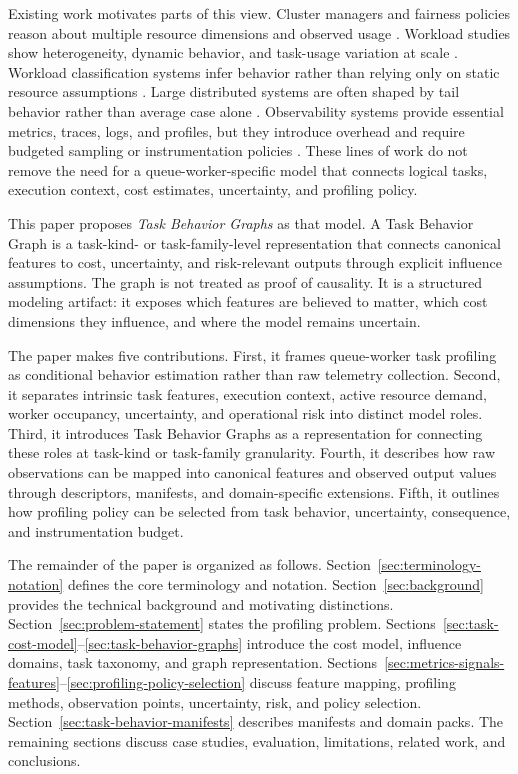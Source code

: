 Existing work motivates parts of this view. Cluster managers and fairness
policies reason about multiple resource dimensions and observed usage
\cite{verma2015borg,ghodsi2011drf}. Workload studies show heterogeneity,
dynamic behavior, and task-usage variation at scale
\cite{zhang2011taskusage,reiss2012heterogeneity,cheng2018alibaba}. Workload
classification systems infer behavior rather than relying only on static
resource assumptions \cite{delimitrou2013paragon,delimitrou2014quasar}. Large
distributed systems are often shaped by tail behavior rather than average case
alone \cite{dean2013tail}. Observability systems provide essential metrics,
traces, logs, and profiles, but they introduce overhead and require budgeted
sampling or instrumentation policies
\cite{sigelman2010dapper,opentelemetrySampling,opentelemetryPerformance}. These
lines of work do not remove the need for a queue-worker-specific model that
connects logical tasks, execution context, cost estimates, uncertainty, and
profiling policy.

This paper proposes \emph{Task Behavior Graphs} as that model. A Task Behavior
Graph is a task-kind- or task-family-level representation that connects
canonical features to cost, uncertainty, and risk-relevant outputs through
explicit influence assumptions. The graph is not treated as proof of causality.
It is a structured modeling artifact: it exposes which features are believed to
matter, which cost dimensions they influence, and where the model remains
uncertain.

The paper makes five contributions. First, it frames queue-worker task profiling
as conditional behavior estimation rather than raw telemetry collection. Second,
it separates intrinsic task features, execution context, active resource demand,
worker occupancy, uncertainty, and operational risk into distinct model roles.
Third, it introduces Task Behavior Graphs as a representation for connecting
these roles at task-kind or task-family granularity. Fourth, it describes how
raw observations can be mapped into canonical features and observed output
values through descriptors, manifests, and domain-specific extensions. Fifth, it
outlines how profiling policy can be selected from task behavior, uncertainty,
consequence, and instrumentation budget.

The remainder of the paper is organized as follows.
Section~\ref{sec:terminology-notation} defines the core terminology and
notation. Section~\ref{sec:background} provides the technical background and
motivating distinctions. Section~\ref{sec:problem-statement} states the
profiling problem. Sections~\ref{sec:task-cost-model}--\ref{sec:task-behavior-graphs}
introduce the cost model, influence domains, task taxonomy, and graph
representation. Sections~\ref{sec:metrics-signals-features}--\ref{sec:profiling-policy-selection}
discuss feature mapping, profiling methods, observation points, uncertainty,
risk, and policy selection. Section~\ref{sec:task-behavior-manifests} describes
manifests and domain packs. The remaining sections discuss case studies,
evaluation, limitations, related work, and conclusions.
